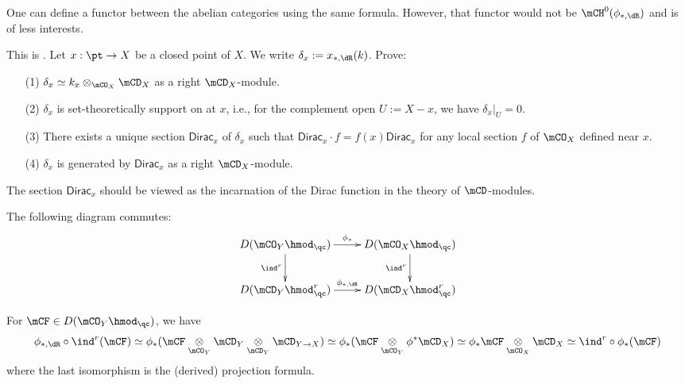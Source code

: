 	\begin{warn}
		One can define a functor between the abelian categories using the same formula. However, that functor would not be $\mCH^0(\phi_{*,\dR})$ and is of less interests.
	\end{warn}

	\begin{exe}
		This is . Let $x:\pt \to X$ be a closed point of $X$. We write $\delta_x:= x_{*,\dR}(k)$. Prove:
		\begin{itemize}
			\item[(1)]
				$\delta_x\simeq k_x \ot_{\mCO_X}\mCD_X$ as a right $\mCD_X$-module.
			\item[(2)]
				$\delta_x$ is set-theoretically support on at $x$, i.e., for the complement open $U:=X-x$, we have $\delta_x|_U = 0$.
			\item[(3)]
				There exists a unique section $\mathsf{Dirac}_x$ of $\delta_x$ such that $\mathsf{Dirac}_x\cdot f = f(x)\mathsf{Dirac}_x$ for any local section $f$ of $\mCO_X$ defined near $x$.
			\item[(4)]
				$\delta_x$ is generated by $\mathsf{Dirac}_x$ as a right $\mCD_X$-module.
		\end{itemize}
	\end{exe}

	\begin{rem}
		The section $\mathsf{Dirac}_x$ should be viewed as the incarnation of the Dirac function in the theory of $\mCD$-modules.
	\end{rem}

	

	\begin{lem}
		The following diagram commutes:
		\begin{equation}
			\label{eqn-push-vs-ind}
			\xymatrix{
				D(\mCO_Y\hmod_\qc) \ar[r]^-{\phi_*} \ar[d]_-{\ind^r} &
				D(\mCO_X\hmod_\qc) \ar[d]_-{\ind^r} \\
				D(\mCD_Y\hmod^r_\qc) \ar[r]^-{\phi_{*,\dR}}  &
				D(\mCD_X\hmod^r_\qc)
			}
		\end{equation}
	\end{lem}

	\proof[Sketch]
		For $\mCF\in D(\mCO_Y\hmod_\qc)$, we have
		\[
			\phi_{*,\dR}\circ \ind^r(\mCF) \simeq \phi_*(\mCF \ot_{\mCO_Y} \mCD_Y \ot_{\mCD_Y} \mCD_{Y\to X} ) \simeq \phi_*(\mCF \ot_{\mCO_Y} \phi^*\mCD_X ) \simeq \phi_*\mCF \ot_{\mCO_X} \mCD_X \simeq \ind^r\circ \phi_*(\mCF)
		\]
		where the last isomorphism is the (derived) projection formula.

